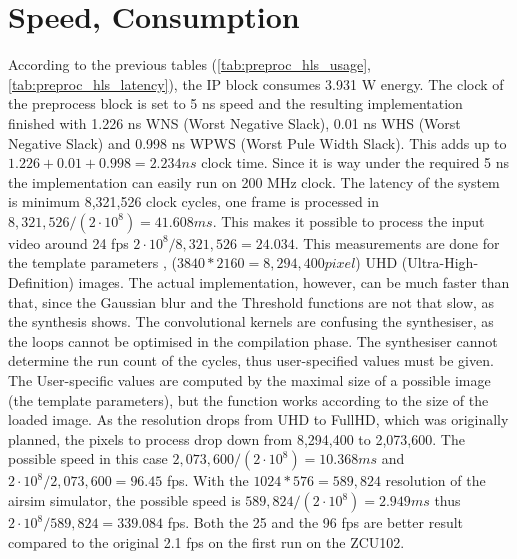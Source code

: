 \section{Speed, Consumption} %

According to the previous tables (\cref{tab:preproc_hls_usage}, \cref{tab:preproc_hls_latency}), the IP block consumes 3.931 W energy.
The clock of the preprocess block is set to 5 ns speed and the resulting implementation finished with 1.226 ns WNS (Worst Negative Slack), 0.01 ns WHS (Worst Negative Slack) and 0.998 ns WPWS (Worst Pule Width Slack).
This adds up to $1.226 + 0.01 + 0.998 = 2.234 ns$ clock time.
Since it is way under the required 5 ns the implementation can easily run on 200 MHz clock.
The latency of the system is minimum 8,321,526 clock cycles, one frame is processed in $8,321,526 / (2\cdot10^8) = 41.608 ms$.
This makes it possible to process the input video around 24 fps $2\cdot10^8/8,321,526=24.034$. %
This measurements are done for the template parameters ,  ($3840 * 2160 = 8,294,400 pixel$) UHD (Ultra-High-Definition) images.
The actual implementation, however, can be much faster than that, since the Gaussian blur and the Threshold functions are not that slow, as the synthesis shows.
The convolutional kernels are confusing the synthesiser, as the loops cannot be optimised in the compilation phase.
The synthesiser cannot determine the run count of the cycles, thus user-specified values must be given.
The User-specific values are computed by the maximal size of a possible image (the template parameters), but the function works according to the size of the loaded image.
As the resolution drops from UHD to FullHD, which was originally planned, the pixels to process drop down from 8,294,400 to 2,073,600.
The possible speed in this case $2,073,600 / (2\cdot10^8) = 10.368 ms$ and $2\cdot10^8/2,073,600 = 96.45$ fps.
With the $1024*576=589,824$ resolution of the airsim simulator, the possible speed is $589,824/ (2\cdot10^8) = 2.949 ms$ thus  $2\cdot10^8/589,824 = 339.084$ fps.
Both the 25 and the 96 fps are better result compared to the original 2.1 fps on the first run on the ZCU102.

\clearpage